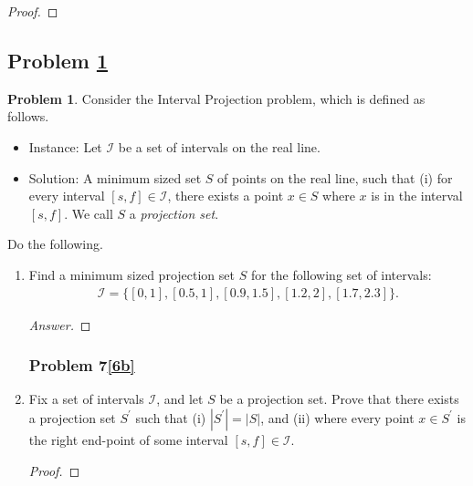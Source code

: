 \documentclass[11pt]{article}
\theoremstyle{definition}
\theoremstyle{definition}
\newtheorem{required}{Problem}
\theoremstyle{definition}
\begin{document}
\begin{proof}
\end{proof}



\newpage
\subsection{Problem \ref{Exchange2}}

\begin{required} \label{Exchange2}
Consider the \textsf{Interval Projection} problem, which is defined as follows.
\begin{itemize}
\item \textsf{Instance:} Let $\mathcal{I}$ be a set of intervals on the real line.
\item \textsf{Solution:} A minimum sized set $S$ of points on the real line, such that (i) for every interval $[s, f] \in \mathcal{I}$, there exists a point $x \in S$ where $x$ is in the interval $[s, f]$. We call $S$ a \textit{projection set}.
\end{itemize}

\noindent Do the following.
\begin{enumerate}[label=(\alph*)]
\subsubsection{Problem 7\ref{6a}}
\item \label{6a} Find a minimum sized projection set $S$ for the following set of intervals:
\begin{align*}
\mathcal{I} = \{ [0, 1], [0.5, 1], [0.9, 1.5], [1.2, 2], [1.7, 2.3] \}.
\end{align*}


\begin{proof}[Answer]
\end{proof}

\newpage
\subsubsection{Problem 7\ref{6b}}
\item \label{6b} Fix a set of intervals $\mathcal{I}$, and let $S$ be a projection set. Prove that there exists a projection set $S^{\prime}$ such that (i) $|S^{\prime}| = |S|$, and (ii) where every point $x \in S^{\prime}$ is the right end-point of some interval $[s, f] \in \mathcal{I}$. 

\begin{proof}
\end{proof}

\end{enumerate}
\end{required}
\end{document}
